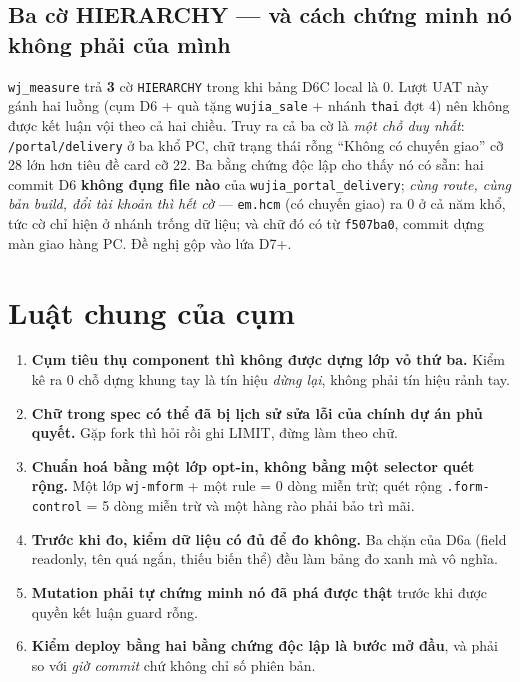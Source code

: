 \subsection*{Ba cờ HIERARCHY --- và cách chứng minh nó không phải của mình}

\texttt{wj\_measure} trả \textbf{3} cờ \texttt{HIERARCHY} trong khi bảng D6C local là 0. Lượt UAT
này gánh hai luồng (cụm D6 + quà tặng \texttt{wujia\_sale} + nhánh \texttt{thai} đợt 4) nên không
được kết luận vội theo cả hai chiều. Truy ra cả ba cờ là \emph{một chỗ duy nhất}:
\texttt{/portal/delivery} ở ba khổ PC, chữ trạng thái rỗng ``Không có chuyến giao'' cỡ 28 lớn hơn
tiêu đề card cỡ 22. Ba bằng chứng độc lập cho thấy nó có sẵn: hai commit D6 \textbf{không đụng
file nào} của \texttt{wujia\_portal\_delivery}; \emph{cùng route, cùng bản build, đổi tài khoản
thì hết cờ} --- \texttt{em.hcm} (có chuyến giao) ra 0 ở cả năm khổ, tức cờ chỉ hiện ở nhánh trống
dữ liệu; và chữ đó có từ \texttt{f507ba0}, commit dựng màn giao hàng PC. Đề nghị gộp vào lứa D7+.

\section{Luật chung của cụm}

\begin{enumerate}
\item \textbf{Cụm tiêu thụ component thì không được dựng lớp vỏ thứ ba.} Kiểm kê ra 0 chỗ dựng
  khung tay là tín hiệu \emph{dừng lại}, không phải tín hiệu rảnh tay.
\item \textbf{Chữ trong spec có thể đã bị lịch sử sửa lỗi của chính dự án phủ quyết.} Gặp fork thì
  hỏi rồi ghi LIMIT, đừng làm theo chữ.
\item \textbf{Chuẩn hoá bằng một lớp opt-in, không bằng một selector quét rộng.} Một lớp
  \texttt{wj-mform} + một rule = 0 dòng miễn trừ; quét rộng \texttt{.form-control} = 5 dòng miễn trừ
  và một hàng rào phải bảo trì mãi.
\item \textbf{Trước khi đo, kiểm dữ liệu có đủ để đo không.} Ba chặn của D6a (field readonly, tên
  quá ngắn, thiếu biến thể) đều làm bảng đo xanh mà vô nghĩa.
\item \textbf{Mutation phải tự chứng minh nó đã phá được thật} trước khi được quyền kết luận guard rỗng.
\item \textbf{Kiểm deploy bằng hai bằng chứng độc lập là bước mở đầu}, và phải so với \emph{giờ
  commit} chứ không chỉ số phiên bản.
\end{enumerate}

